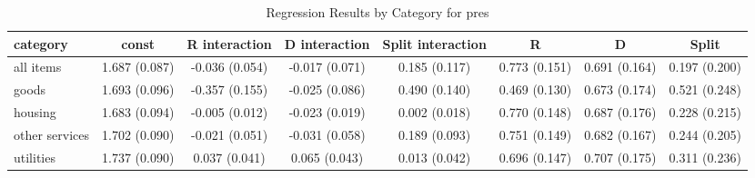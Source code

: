 \begin{table}[H]
\caption{Regression Results by Category for pres}
\label{tab:regression_results}
\begin{tabular}{lccccccc}
\toprule
category & const & R interaction & D interaction & Split interaction & R & D & Split \\
\midrule
all items & 1.687 (0.087) & -0.036 (0.054) & -0.017 (0.071) & 0.185 (0.117) & 0.773 (0.151) & 0.691 (0.164) & 0.197 (0.200) \\
goods & 1.693 (0.096) & -0.357 (0.155) & -0.025 (0.086) & 0.490 (0.140) & 0.469 (0.130) & 0.673 (0.174) & 0.521 (0.248) \\
housing & 1.683 (0.094) & -0.005 (0.012) & -0.023 (0.019) & 0.002 (0.018) & 0.770 (0.148) & 0.687 (0.176) & 0.228 (0.215) \\
other services & 1.702 (0.090) & -0.021 (0.051) & -0.031 (0.058) & 0.189 (0.093) & 0.751 (0.149) & 0.682 (0.167) & 0.244 (0.205) \\
utilities & 1.737 (0.090) & 0.037 (0.041) & 0.065 (0.043) & 0.013 (0.042) & 0.696 (0.147) & 0.707 (0.175) & 0.311 (0.236) \\
\bottomrule
\end{tabular}
\end{table}
